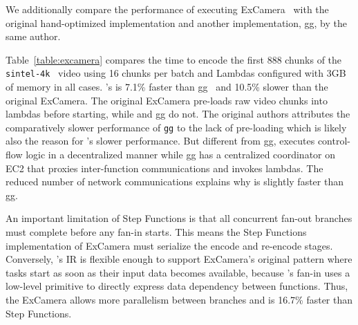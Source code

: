 

We additionally compare the performance of executing ExCamera~\cite{excamera}
with the original hand-optimized implementation and another implementation,
gg, by the same author.

Table~\ref{table:excamera} compares the time to encode the first 888 chunks of
the \texttt{sintel-4k}~\cite{sintel} video using 16 chunks per batch and
Lambdas configured with 3GB of memory in all cases. \name{}'s is 7.1\% faster
than gg~\cite{gg-atc} and 10.5\% slower than the original ExCamera. The
original ExCamera pre-loads raw video chunks into lambdas before starting,
while \name{} and gg do not. The original authors attributes the comparatively
slower performance of \texttt{gg} to the lack of pre-loading which is likely
also the reason for \name{}'s slower performance. But different from gg,
\name{} executes control-flow logic in a decentralized manner while gg has a
centralized coordinator on EC2 that proxies inter-function communications and
invokes lambdas. The reduced number of network communications explains why
\name{} is slightly faster than gg.

An important limitation of Step Functions is that all concurrent fan-out
branches must complete before any fan-in starts. This means the Step Functions
implementation of ExCamera must serialize the encode and re-encode stages.
Conversely, \name{}'s IR is flexible enough to support ExCamera's original
pattern where tasks start as soon as their input data becomes available,
because \name{}'s fan-in uses a low-level primitive to directly express data
dependency between functions. Thus, the \name{} ExCamera allows more
parallelism between branches and is 16.7\% faster than Step Functions.

